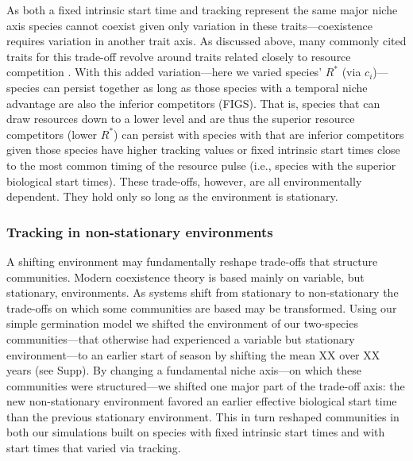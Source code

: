 \documentclass[11pt,letterpaper]{article}
\begin{document}
As both a fixed intrinsic start time and tracking represent the same major niche axis species cannot coexist given only variation in these traits---coexistence requires variation in another trait axis. As discussed above, many commonly cited traits for this trade-off revolve around traits related closely to resource competition \citep{Chesson:2004eo}. With this added variation---here we varied species' $R^*$ (via $c_i$)---species can persist together as long as those species with a temporal niche advantage are also the inferior competitors (FIGS). That is, species that can draw resources down to a lower level and are thus the superior resource competitors (lower $R^*$) can persist with species with that are inferior competitors given those species have higher tracking values or fixed intrinsic start times close to the most common timing of the resource pulse (i.e., species with the superior biological start times). These trade-offs, however, are all environmentally dependent. They hold only so long as the environment is stationary. 

\subsubsection{Tracking in non-stationary environments}
A shifting environment may fundamentally reshape trade-offs that structure communities. Modern coexistence theory is based mainly on variable, but stationary, environments. As systems shift from stationary to non-stationary the trade-offs on which some communities are based may be transformed. Using our simple germination model we shifted the environment of our two-species communities---that otherwise had experienced a variable but stationary environment---to an earlier start of season by shifting the mean XX over XX years (see Supp). By changing a fundamental niche axis---on which these communities were structured---we shifted one major part of the trade-off axis: the new non-stationary environment favored an earlier effective biological start time than the previous stationary environment. This in turn reshaped communities in both our simulations built on species with fixed intrinsic start times and with start times that varied via tracking. 
\end{document}
